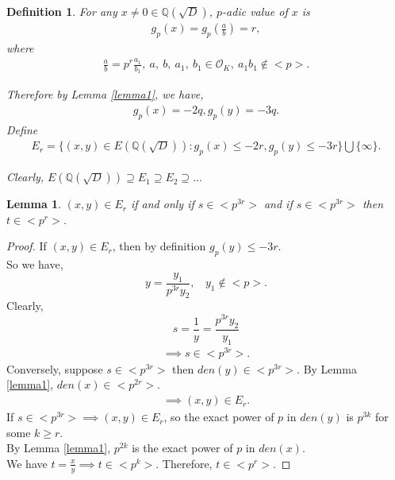 \documentclass[12pt,leqno]{amsart}
\newcommand{\<}{\langle}
\renewcommand{\>}{\rangle}
\newtheorem*{definition}{Definition}
\newtheorem{lemma}{Lemma}
\theoremstyle{definition}
\numberwithin{equation}{section}
\begin{document}
\begin{definition}
    For any $x\neq 0\in \mathbb Q(\sqrt{D})$, $p$-adic value of $x$ is
    \begin{align*}
        g_p(x)=g_p(\frac{a}{b})=r,
    \end{align*}
    where\\
    \begin{align*}
       \frac{a}{b}=p^r\frac{a_1}{b_1},~a,~b,~a_1,~b_1\in{\mathcal{O}_K},~a_1b_1\notin <p>. 
    \end{align*}
    
    Therefore by Lemma \ref{lemma1}, we have,
    \begin{align*}
        g_p(x)=-2q, g_p(y)=-3q.
    \end{align*}
    Define\\
    \begin{align*}
         E_r=\{(x,y)\in E(\mathbb Q(\sqrt{D})):g_p(x)\leq -2r, g_p(y)\leq -3r\}\bigcup \{\infty\}.
    \end{align*}
   
    \smallskip
    Clearly, $E(\mathbb Q(\sqrt{D}))\supseteq E_1\supseteq E_2\supseteq ...$
\end{definition}
\begin{lemma}\label{lemma9}
$(x,y)\in E_r$ if and only if $s\in <p^{3r}>$ and if $s\in <p^{3r}>$ then $t\in <p^r>$.
\end{lemma}
\begin{proof}
    If $(x,y)\in E_r$, then by definition $g_p(y)\leq -3r$.\\
    So we have,
    \begin{equation*}
        y=\frac{y_1}{p^{3r}y_2},~~~~y_1\notin <p>.
    \end{equation*}
Clearly,
\begin{equation*}
    s=\frac{1}{y}=\frac{p^{3r}y_2}{y_1}
\end{equation*}
\begin{align*}
    \implies s\in  <p^{3r}>.
\end{align*}
Conversely, suppose $s\in<p^{3r}>$ then $den(y)\in <p^{3r}>$. By Lemma \ref{lemma1}, $den(x)\in<p^{2r}>$.
\begin{align*}
    \implies (x,y)\in E_r.
\end{align*}
If $s\in <p^{3r}>\implies (x,y)\in E_r$, so the exact power of $p$ in $den(y)$ is $p^{3k}$ for some $k\geq r$.\\
By Lemma \ref{lemma1}, $p^{2k}$ is the exact power of $p$ in $den(x)$.\\
We have $t=\frac{x}{y}\implies t\in <p^k>$. Therefore, $t\in <p^{r}>$.

\end{proof}
\end{document}
